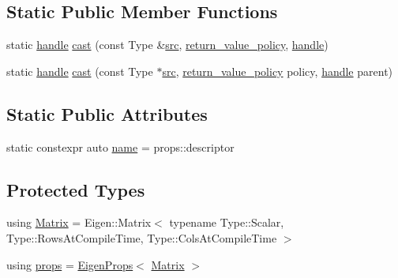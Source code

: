 \subsection*{Static Public Member Functions}
\begin{DoxyCompactItemize}
\item 
static \mbox{\hyperlink{classhandle}{handle}} \mbox{\hyperlink{structtype__caster_3_01_type_00_01enable__if__t_3_01is__eigen__other_3_01_type_01_4_1_1value_01_4_01_4_ada76b4f2900fcf0a8f98727110bfa3e3}{cast}} (const Type \&\mbox{\hyperlink{_s_d_l__opengl__glext_8h_a72e0fdf0f845ded60b1fada9e9195cd7}{src}}, \mbox{\hyperlink{detail_2common_8h_adde72ab1fb0dd4b48a5232c349a53841}{return\+\_\+value\+\_\+policy}}, \mbox{\hyperlink{classhandle}{handle}})
\item 
static \mbox{\hyperlink{classhandle}{handle}} \mbox{\hyperlink{structtype__caster_3_01_type_00_01enable__if__t_3_01is__eigen__other_3_01_type_01_4_1_1value_01_4_01_4_a840872c8083396d9f6b2547d1a9cdbf2}{cast}} (const Type $\ast$\mbox{\hyperlink{_s_d_l__opengl__glext_8h_a72e0fdf0f845ded60b1fada9e9195cd7}{src}}, \mbox{\hyperlink{detail_2common_8h_adde72ab1fb0dd4b48a5232c349a53841}{return\+\_\+value\+\_\+policy}} policy, \mbox{\hyperlink{classhandle}{handle}} parent)
\end{DoxyCompactItemize}
\subsection*{Static Public Attributes}
\begin{DoxyCompactItemize}
\item 
static constexpr auto \mbox{\hyperlink{structtype__caster_3_01_type_00_01enable__if__t_3_01is__eigen__other_3_01_type_01_4_1_1value_01_4_01_4_a42b92f44ddf23371cfa25c5384eb0f9d}{name}} = props\+::descriptor
\end{DoxyCompactItemize}
\subsection*{Protected Types}
\begin{DoxyCompactItemize}
\item 
using \mbox{\hyperlink{structtype__caster_3_01_type_00_01enable__if__t_3_01is__eigen__other_3_01_type_01_4_1_1value_01_4_01_4_a398c545dcd18f723905d9809fd2a5b8e}{Matrix}} = Eigen\+::\+Matrix$<$ typename Type\+::\+Scalar, Type\+::\+Rows\+At\+Compile\+Time, Type\+::\+Cols\+At\+Compile\+Time $>$
\item 
using \mbox{\hyperlink{structtype__caster_3_01_type_00_01enable__if__t_3_01is__eigen__other_3_01_type_01_4_1_1value_01_4_01_4_abc2edf13189f5bca8a7159ca2c444598}{props}} = \mbox{\hyperlink{struct_eigen_props}{Eigen\+Props}}$<$ \mbox{\hyperlink{structtype__caster_3_01_type_00_01enable__if__t_3_01is__eigen__other_3_01_type_01_4_1_1value_01_4_01_4_a398c545dcd18f723905d9809fd2a5b8e}{Matrix}} $>$
\end{DoxyCompactItemize}


